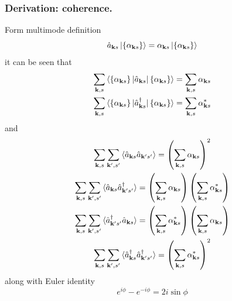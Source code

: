\documentclass[../../../main.tex]{subfiles}
\begin{document}
\subsubsection{Derivation: coherence.}
Form multimode definition
\begin{equation*}
  \hat{a}_{\mathbf{k }s} \ket{\left\{ \alpha_{\mathbf{k }s} \right\} }=\alpha_{\mathbf{k }s} \ket{\left\{ \alpha_{\mathbf{k }s} \right\} }
\end{equation*}
it can be seen that
\begin{align*}
  \sum_{\mathbf{k },s}  \braket{\left\{ \alpha_{\mathbf{k }s } \right\}    | \hat{a}_{\mathbf{k }s} | \left\{ \alpha_{\mathbf{k }s} \right\} }         & =  \sum_{\mathbf{k },s} \alpha_{\mathbf{k }s}   \\
  \sum_{\mathbf{k },s} \braket{\left\{ \alpha_{\mathbf{k }s } \right\}    | \hat{a}^\dagger_{\mathbf{k }s}  | \left\{ \alpha_{\mathbf{k }s} \right\} } & = \sum_{\mathbf{k },s} \alpha_{\mathbf{k }s} ^*
\end{align*}
and
\begin{gather*}
  \sum_{\mathbf{k},s}\sum_{\mathbf{k}',s'} \braket{\hat{a}_{\mathbf{k }s}   \hat{a}_{\mathbf{k }'s'} }
  =\left( \sum_{\mathbf{k},s} \alpha_{\mathbf{k}s} \right)^{2}
  \\
  \sum_{\mathbf{k},s}\sum_{\mathbf{k}',s'} \braket{\hat{a}_{\mathbf{k }s}   \hat{a}^\dagger_{\mathbf{k }'s'} }
  =\left( \sum_{\mathbf{k},s} \alpha_{\mathbf{k}s}  \right) \left( \sum_{\mathbf{k},s} \alpha^{*}_{\mathbf{k}s} \right)
  \\
  \sum_{\mathbf{k},s}\sum_{\mathbf{k}',s'} \braket{\hat{a}^\dagger_{\mathbf{k }'s'}\hat{a}_{\mathbf{k }s}}
  =\left( \sum_{\mathbf{k},s} \alpha^{*}_{\mathbf{k}s} \right) \left( \sum_{\mathbf{k},s} \alpha_{\mathbf{k}s} \right)
  \\
  \sum_{\mathbf{k},s}\sum_{\mathbf{k}',s'} \braket{\hat{a}^\dagger_{\mathbf{k }s}   \hat{a}^\dagger_{\mathbf{k }'s'} }
  =\left( \sum_{\mathbf{k},s} \alpha^{*}_{\mathbf{k}s} \right)^{2}
\end{gather*}
along with Euler identity
\begin{equation*}
  e ^{i\phi}-e ^{-i\phi}=2i \sin \phi
\end{equation*}
\end{document}
